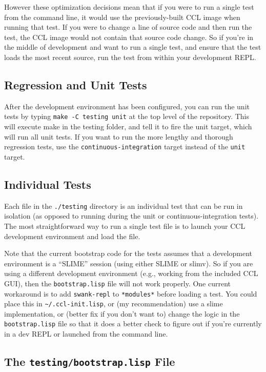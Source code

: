 \documentclass[12pt]{article} %
\newcommand{\code}[1]{\texttt{#1}}
\newcommand{\filesys}[1]{\texttt{#1}}
\begin{document}
However these optimization decisions mean that if you were to run a single test from the command line, it would use the previously-built CCL image when running that test.
If you were to change a line of source code and then run the test, the CCL image would not contain that source code change.
So if you're in the middle of development and want to run a single test, and ensure that the test loads the most recent source, run the test from within your development REPL.

\subsection{Regression and Unit Tests}

After the development environment has been configured, you can run the unit tests by typing \code{make -C testing unit} at the top level of the repository.
This will execute make in the testing folder, and tell it to fire the unit target, which will run all unit tests.
If you want to run the more lengthy and thorough regression tests, use the \code{continuous-integration} target instead of the \code{unit} target.

\subsection{Individual Tests}

Each file in the \filesys{./testing} directory is an individual test that can be run in isolation (as opposed to running during the unit or continuous-integration tests).
The most straightforward way to run a single test file is to launch your CCL development environment and load the file.

Note that the current bootstrap code for the tests assumes that a development environment is a ``SLIME'' session (using either SLIME or slimv).
So if you are using a different development environment (e.g., working from the included CCL GUI), then the \filesys{bootstrap.lisp} file will not work properly.
One current workaround is to add \code{swank-repl} to \code{*modules*} before loading a test.
You could place this in \code{\textasciitilde/.ccl-init.lisp}, or (my recommendation) use a slime implementation, or
(better fix if you don't want to) change the logic in the \filesys{bootstrap.lisp} file so that it does a better check to figure out if you're currently in a dev REPL or launched from the command line.

\subsection{The \filesys{testing/bootstrap.lisp} File}
\end{document}
